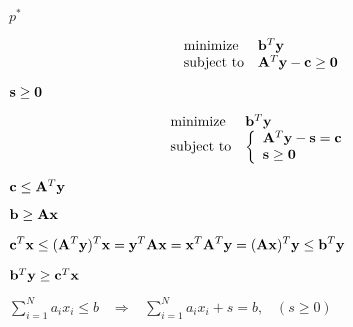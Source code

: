 \documentclass{article}
\def\lthtmlcheckvsize{\ifdim\ht\sizebox<\vsize 
  \ifdim\wd\sizebox<\hsize\expandafter\hfill\fi \expandafter\vfill
  \else\expandafter\vss\fi}%
\begin{document}
{\newpage\clearpage
{}%
$ p^*$%
\lthtmlindisplaymathZ
\lthtmlcheckvsize\clearpage}

{\newpage\clearpage
{}%
\begin{displaymath}\begin{array}{ll}
\mbox{minimize} & {\bf b}^T{\bf y}\\
\mbox{subject to} & {\bf A}^T{\bf y}-{\bf c}\ge {\bf0}\\
\end{array}\end{displaymath}%
\lthtmldisplayZ
\lthtmlcheckvsize\clearpage}

{\newpage\clearpage
{}%
$ {\bf s}\ge {\bf0}$%
\lthtmlindisplaymathZ
\lthtmlcheckvsize\clearpage}

{\newpage\clearpage
{}%
\begin{displaymath}\begin{array}{ll}
\mbox{minimize} & {\bf b}^T{\bf y}\\
\mbox{subject to} & \left\{\begin{array}{l}
{\bf A}^T{\bf y}-{\bf s}={\bf c}\\
{\bf s}\ge {\bf0}\end{array}\right.\\
\end{array}\end{displaymath}%
\lthtmldisplayZ
\lthtmlcheckvsize\clearpage}

{\newpage\clearpage
{}%
$ {\bf c}\le {\bf A}^T{\bf y}$%
\lthtmlindisplaymathZ
\lthtmlcheckvsize\clearpage}

{\newpage\clearpage
{}%
$ {\bf b}\ge{\bf Ax}$%
\lthtmlindisplaymathZ
\lthtmlcheckvsize\clearpage}

{\newpage\clearpage
{}%
$\displaystyle {\bf c}^T{\bf x}\le({\bf A}^T{\bf y})^T{\bf x}
={\bf y}^T{\bf Ax}={\bf x}^T{\bf A}^T{\bf y}
=({\bf Ax})^T{\bf y}\le{\bf b}^T{\bf y}$%
\lthtmlindisplaymathZ
\lthtmlcheckvsize\clearpage}

{\newpage\clearpage
{}%
$ {\bf b}^T{\bf y}\ge {\bf c}^T{\bf x}$%
\lthtmlindisplaymathZ
\lthtmlcheckvsize\clearpage}

{\newpage\clearpage
{}%
$\displaystyle \sum_{i=1}^N a_ix_i\le b \;\;\;\Longrightarrow\;\;\;
\sum_{i=1}^N a_ix_i + s = b,\;\;\;(s\ge 0)$%
\lthtmlindisplaymathZ
\lthtmlcheckvsize\clearpage}
\end{document}
